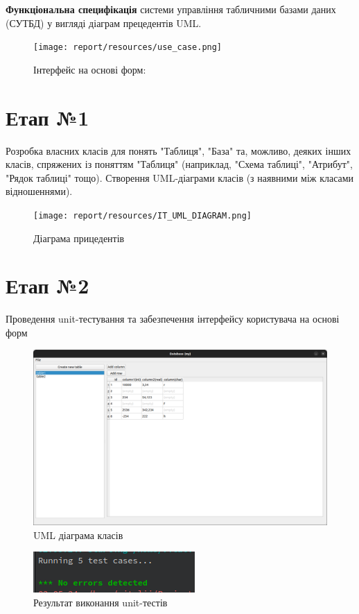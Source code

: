 \documentclass[a4paper, 12pt]{article}
\begin{document}
\textbf{Функціональна специфікація} системи управління табличними базами даних (СУТБД) у вигляді діаграм прецедентів UML.

\begin{figure}[H]
\centering
\texttt{[image: report/resources/use\_case.png]}
\caption{Інтерфейс на основі форм:}
\end{figure}

\section{Етап №1}
Розробка власних класів для понять "Таблиця", "База" та, можливо, деяких інших класів, спряжених із поняттям "Таблиця" (наприклад, "Схема таблиці", "Атрибут", "Рядок таблиці" тощо). Створення UML-діаграми класів (з наявними між класами відношеннями).

\begin{figure}[H]
\centering
\texttt{[image: report/resources/IT\_UML\_DIAGRAM.png]}
\caption{Діаграма прицедентів}
\end{figure}

\section{Етап №2}
Проведення unit-тестування та забезпечення інтерфейсу користувача на основі форм

\begin{figure}[H]
\centering
\includegraphics[scale=0.3]{resources/DesktopWindow.png}
\caption{UML діаграма класів}
\end{figure}

\begin{figure}[H]
\centering
\includegraphics[scale=0.8]{resources/UnitTests.png}
\caption{Результат виконання unit-тестів}
\end{figure}
\end{document}
